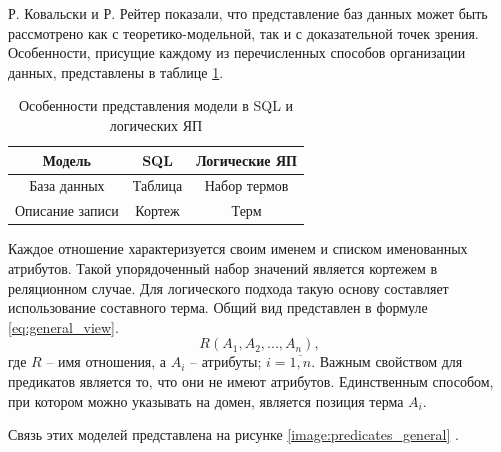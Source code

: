 Р. Ковальски \cite{approach_kowalski} и Р. Рейтер \cite{approach_reiter} показали, что представление баз данных может быть рассмотрено как с теоретико-модельной, так и с доказательной точек зрения. Особенности, присущие каждому из перечисленных способов организации данных, представлены в таблице \ref{table:features_approaches}.

\begin{table}[ht!]
	\centering
	\captionsetup{singlelinecheck = false, justification=raggedright}
	\caption{Особенности представления модели в SQL и логических ЯП}
	\label{table:features_approaches}
	\begin{tabular}{|c|c|c|}
		\hline
		\textbf{Модель} & \textbf{SQL} & \textbf{Логические ЯП} \\ \hline
		База данных & Таблица & Набор термов \\ \hline
		Описание записи& Кортеж & Терм \\ \hline
	\end{tabular}
\end{table}

Каждое отношение характеризуется своим именем и списком именованных атрибутов. Такой упорядоченный набор значений является кортежем в реляционном случае. Для логического подхода такую основу составляет использование составного терма. Общий вид представлен в формуле \eqref{eq:general_view}.
\begin{equation}
	\label{eq:general_view}
	R(A_1, A_2,...,A_n),
\end{equation}
где $R$ -- имя отношения, а $A_i$ -- атрибуты; $i = \overline{1, n}$. Важным свойством для предикатов является то, что они не имеют атрибутов. Единственным способом, при котором можно указывать на домен, является позиция терма $A_i$.

Связь этих моделей представлена на рисунке \ref{image:predicates_general} \cite{logica}.
\begin{figure}[H]
\end{figure}

